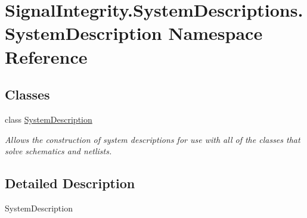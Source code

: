 \hypertarget{namespaceSignalIntegrity_1_1SystemDescriptions_1_1SystemDescription}{}\section{Signal\+Integrity.\+System\+Descriptions.\+System\+Description Namespace Reference}
\label{namespaceSignalIntegrity_1_1SystemDescriptions_1_1SystemDescription}
\subsection*{Classes}
\begin{DoxyCompactItemize}
\item 
class \hyperlink{classSignalIntegrity_1_1SystemDescriptions_1_1SystemDescription_1_1SystemDescription}{System\+Description}
\begin{DoxyCompactList}\small\item\em Allows the construction of system descriptions for use with all of the classes that solve schematics and netlists. \end{DoxyCompactList}\end{DoxyCompactItemize}


\subsection{Detailed Description}
\begin{DoxyVerb}SystemDescription\end{DoxyVerb}
 